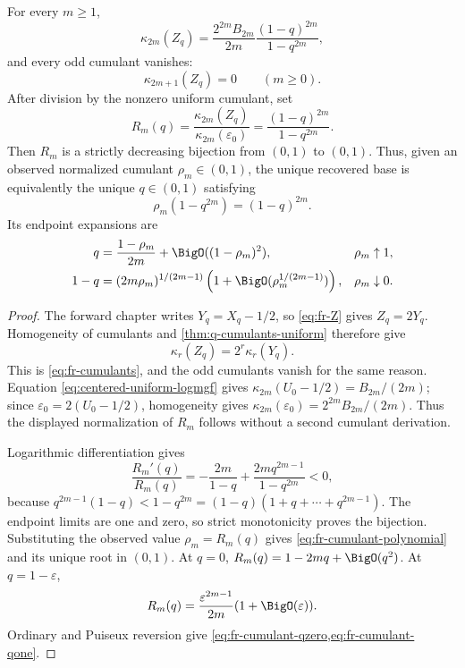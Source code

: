 \begin{theorem}
\label{thm:fr-cumulant-recovery}
For every \(m\ge1\),
\begin{equation}
 \kappa_{2m}(Z_q)
 =\frac{2^{2m}B_{2m}}{2m}
   \frac{(1-q)^{2m}}{1-q^{2m}},
 \label{eq:fr-cumulants}
\end{equation}
and every odd cumulant vanishes:
\begin{equation}
 \kappa_{2m+1}(Z_q)=0\qquad(m\ge0).
 \label{eq:fr-odd-cumulants}
\end{equation}
After division by the nonzero uniform cumulant, set
\[
 R_m(q)=\frac{\kappa_{2m}(Z_q)}{\kappa_{2m}(\varepsilon_0)}
 =\frac{(1-q)^{2m}}{1-q^{2m}}.
\]
Then \(R_m\) is a strictly decreasing bijection from \((0,1)\) to \((0,1)\).
Thus, given an observed normalized cumulant \(\rho_m\in(0,1)\), the unique
recovered base is equivalently the unique \(q\in(0,1)\) satisfying
\begin{equation}
 \rho_m(1-q^{2m})=(1-q)^{2m}.
 \label{eq:fr-cumulant-polynomial}
\end{equation}
Its endpoint expansions are
\begin{align}
 q&=\frac{1-\rho_m}{2m}+\BigO((1-\rho_m)^2),
 &&\rho_m\uparrow1,\label{eq:fr-cumulant-qzero}\\
 1-q&=(2m\rho_m)^{1/(2m-1)}
 \left(1+\BigO(\rho_m^{1/(2m-1)})\right),
 &&\rho_m\downarrow0.\label{eq:fr-cumulant-qone}
\end{align}
\end{theorem}

\begin{proof}
The forward chapter writes \(Y_q=X_q-1/2\), so \cref{eq:fr-Z} gives
\(Z_q=2Y_q\).  Homogeneity of cumulants and
\cref{thm:q-cumulants-uniform} therefore give
\[
 \kappa_r(Z_q)=2^r\kappa_r(Y_q).
\]
This is \cref{eq:fr-cumulants}, and the odd cumulants vanish for the same
reason.  Equation \eqref{eq:centered-uniform-logmgf} gives
\(\kappa_{2m}(U_0-1/2)=B_{2m}/(2m)\); since
\(\varepsilon_0=2(U_0-1/2)\), homogeneity gives
\(\kappa_{2m}(\varepsilon_0)=2^{2m}B_{2m}/(2m)\).  Thus the displayed
normalization of \(R_m\) follows without a second cumulant derivation.

Logarithmic differentiation gives
\[
 \frac{R_m'(q)}{R_m(q)}
 =-\frac{2m}{1-q}+\frac{2mq^{2m-1}}{1-q^{2m}}<0,
\]
because
\(q^{2m-1}(1-q)<1-q^{2m}=(1-q)(1+q+\cdots+q^{2m-1})\).
The endpoint limits are one and zero, so strict monotonicity proves the
bijection.  Substituting the observed value \(\rho_m=R_m(q)\) gives
\cref{eq:fr-cumulant-polynomial} and its unique root in \((0,1)\).
At \(q=0\), \(R_m(q)=1-2mq+\BigO(q^2)\).  At \(q=1-\varepsilon\),
\[
 R_m(q)=\frac{\varepsilon^{2m-1}}{2m}
 (1+\BigO(\varepsilon)).
\]
Ordinary and Puiseux reversion give
\cref{eq:fr-cumulant-qzero,eq:fr-cumulant-qone}.
\end{proof}

